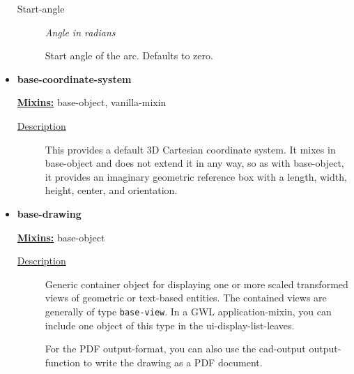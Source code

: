 \documentclass [11pt]{book}
\begin{document}
\begin{itemize}
\begin{description}
\item [Start-angle]
\emph{Angle in radians}

 Start angle of the arc. Defaults to zero.




\end{description}







\item {}
\label{prim:base-coordinate-system}
\textbf{base-coordinate-system}


\textbf{
\underline{Mixins:}} base-object, vanilla-mixin





\begin{description}

\item [
\underline{Description}]


This provides a default 3D Cartesian
   coordinate system. It mixes in base-object and does not extend it
   in any way, so as with base-object, it provides an imaginary
   geometric reference box with a length, width, height, center, and
   orientation.



\end{description}









\item {}
\label{prim:base-drawing}
\textbf{base-drawing}


\textbf{
\underline{Mixins:}} base-object





\begin{description}

\item [
\underline{Description}]


Generic container object for displaying one or more scaled
transformed views of geometric or text-based entities. The contained views are generally 
of type \texttt{base-view}. In a GWL application-mixin, you can include one 
object of this type in the ui-display-list-leaves.

For the PDF output-format, you can also use the cad-output output-function to write the 
drawing as a PDF document. 


\end{description}
\end{itemize}
\end{document}
